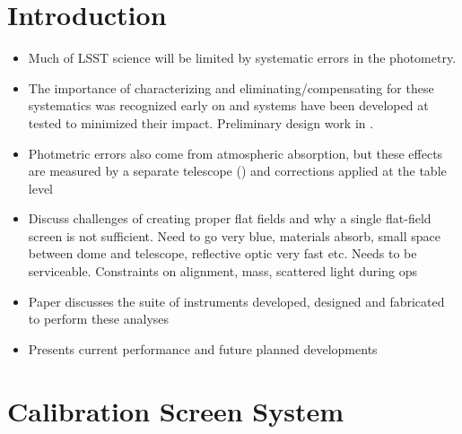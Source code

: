 \section{Introduction}

\begin{itemize} 
\item 
Much of LSST science will be limited by systematic errors in the photometry. 
\item 
The importance of characterizing and eliminating/compensating for these systematics was recognized early on and systems have been developed at tested to minimized their impact. Preliminary design work in \cite{Ingraham2016}.
\item Photmetric errors also come from atmospheric absorption, but these effects are measured by a separate telescope (\cite{PSTN-028}) and corrections applied at the table level 
\item 
Discuss challenges of creating proper flat fields and why a single flat-field screen is not sufficient. Need to go very blue, materials absorb, small space between dome and telescope, reflective optic very fast etc. Needs to be serviceable. Constraints on alignment, mass, scattered light during ops 
\item
Paper discusses the suite of instruments developed, designed and fabricated to perform these analyses
\item
Presents current performance and future planned developments
\end{itemize}

 
\section{Calibration Screen System} 

